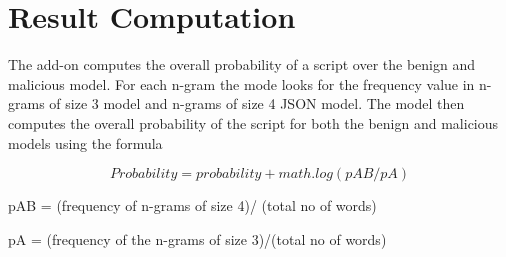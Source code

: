 \newpage



\section{Result Computation}

The add-on computes the overall probability of a script over the benign and malicious model. For each n-gram the mode looks for the frequency value in n-grams of size 3 model and n-grams of size 4 JSON model. The model then computes the overall probability of the script for both the benign and malicious models using the formula

\[Probability = probability + math.log(pAB/pA)\]


pAB = (frequency of n-grams of size 4)/ (total no of words)

pA = (frequency of the n-grams of size 3)/(total no of words)





